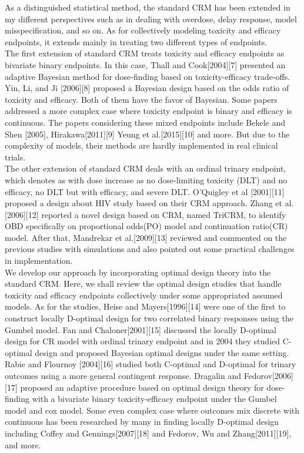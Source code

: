 \documentclass[12pt]{article}
\begin{document}
As a distinguished statistical method, the standard CRM has been extended in my different perspectives such as in dealing with overdose, delay response, model misspecification, and so on. As for collectively modeling toxicity and efficacy endpoints, it extends mainly in treating two different types of endpoints.\\
The first extension of standard CRM treats toxicity and efficacy endpoints as bivariate binary endpoints. In this case, Thall and Cook[2004][7] presented an adaptive Bayesian method for dose‐finding based on toxicity-efficacy trade‐offs. Yin, Li, and Ji [2006][8] proposed a Bayesian design based on the odds ratio of toxicity and efficacy. Both of them have the favor of Bayesian. Some papers addressed a more complex case where toxicity endpoint is binary and efficacy is continuous. The papers considering these mixed endpoints include Bekele and Shen [2005], Hirakawa[2011][9] Yeung et al.[2015][10] and more. But due to the complexity of models, their methods are hardly implemented in real clinical trials.\\
The other extension of standard CRM deals with an ordinal trinary endpoint, which denotes as with dose increase as no dose-limiting toxicity (DLT) and no efficacy, no DLT but with efficacy, and severe DLT. O’Quigley et al [2001][11] proposed a design about HIV study based on their CRM approach. Zhang et al.[2006][12] reported a novel design based on CRM, named TriCRM, to identify OBD specifically on proportional odds(PO) model and continuation ratio(CR) model. After that, Mandrekar et al.[2009][13] reviewed and commented on the previous studies with simulations and also pointed out some practical challenges in implementation.\\
We develop our approach by incorporating optimal design theory into the standard CRM. Here, we shall review the optimal design studies that handle toxicity and efficacy endpoints collectively under some appropriated assumed models. As for the studies, Heise and Mayers[1996][14] were one of the first to construct locally D-optimal design for two correlated binary responses using the Gumbel model. Fan and Chaloner[2001][15] discussed the locally D-optimal design for CR model with ordinal trinary endpoint and in 2004 they studied C-optimal design and proposed Bayesian optimal designs under the same setting. Rabie and Flournoy [2004][16] studied both C-optimal and D-optimal for trinary outcomes using a more general contingent response. Dragalin and Fedorov[2006][17] proposed an adaptive procedure based on optimal design theory for dose-finding with a bivariate binary toxicity-efficacy endpoint under the Gumbel model and cox model. Some even complex case where outcomes mix discrete with continuous has been researched by many in finding locally D-optimal design including Coffey and Gennings[2007][18] and Fedorov, Wu and Zhang[2011][19], and more.\\
\end{document}
